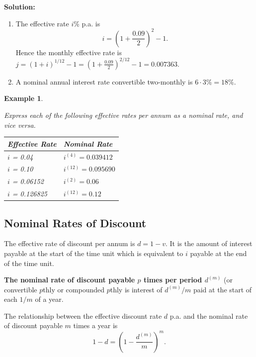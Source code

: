\documentclass[landscape, 20pt]{extreport}
\theoremstyle{definition}
\theoremstyle{definition}
\newtheorem{example}{Example}[chapter]
\theoremstyle{definition}
\theoremstyle{definition}
\theoremstyle{remark}
\begin{document}
\textbf{Solution:}

\begin{enumerate}
\def\labelenumi{\arabic{enumi}.}
\item
  The effective rate \(i\)\% p.a. is \[i = ( 1 + \frac{0.09}{2})^2 - 1.\]
  Hence the monthly effective rate is
  \(j = (1 + i)^{1/12} - 1 = ( 1 + \frac{0.09}{2})^{2/12} - 1 = 0.007363\).
\item
  A nominal annual interest rate convertible two-monthly is
  \(6 \cdot 3\% = 18\%\).
\end{enumerate}

\newpage \begin{example}
\protect\hypertarget{exm:unlabeled-div-35}{}\label{exm:unlabeled-div-35}

\emph{Express each of the following effective rates per
annum as a nominal rate, and vice versa.}

\begin{longtable}[]{@{}ll@{}}
\toprule
\textbf{\emph{Effective Rate}} & \textbf{\emph{Nominal Rate}} \\
\midrule
\endhead
\emph{\(i\) = 0.04} & \emph{\(i^{(4)} = 0.039412\)} \\
\emph{\(i\) = 0.10} & \emph{\(i^{(12)} = 0.095690\)} \\
\emph{\(i\) = 0.06152} & \emph{\(i^{(2)} = 0.06\)} \\
\emph{\(i\) = 0.126825} & \emph{\(i^{(12)} = 0.12\)} \\
\bottomrule
\end{longtable}

\end{example}

\hypertarget{nominal-rates-of-discount}{%
\subsection{Nominal Rates of Discount}\label{nominal-rates-of-discount}}

The effective rate of discount per annum is \(d = 1 -v\). It is the amount
of interest payable at the start of the time unit which is equivalent to
\(i\) payable at the end of the time unit.

\textbf{The nominal rate of discount payable \(p\) times per period \(d^{(m)}\)}
(or convertible \(p\)thly or compounded \(p\)thly is interest of \(d^{(m)}/m\)
paid at the start of each \(1/m\) of a year.

The relationship between the effective discount rate \(d\) p.a. and the
nominal rate of discount payable \(m\) times a year is
\[1 - d = \left(1 - \frac{d^{(m)}}{m}\right)^m.\]
\end{document}
